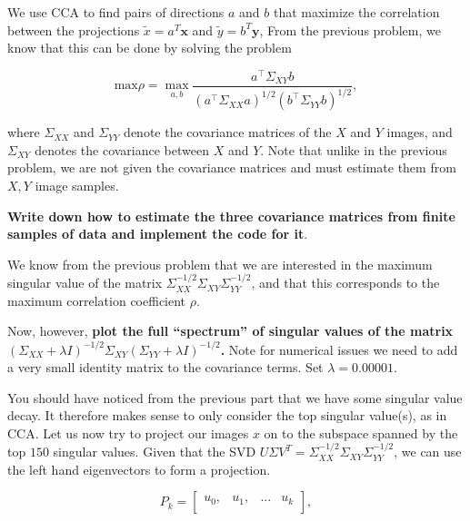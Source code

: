 \begin{Parts}
\Part We use CCA to find pairs of directions $a$ and $b$
that maximize the correlation between the projections $\tilde{x} = a^T\mathbf{x}$ and $\tilde{y} = b^T\mathbf{y}$,  From the previous problem, we know that this can be done by solving the problem 

$$\mbox{max} \rho = \max_{a, b} \frac{a^\top \Sigma_{XY} b}{ \left( a^\top \Sigma_{XX} a\right)^{1/2} \left( b^\top \Sigma_{YY} b\right)^{1/2} },$$ 

where $\Sigma_{XX}$ and $\Sigma_{YY}$ denote the covariance matrices
of the $X$ and $Y$ images, and $\Sigma_{XY}$ denotes the covariance
between $X$ and $Y$. Note that unlike in the previous problem, we are not given the covariance matrices and must estimate them from $X, Y$ image samples.

{\bf Write down how to estimate the three covariance matrices from finite samples of data and implement the code for it}.





\Part We know from the previous problem that we are interested in the
maximum singular value of the matrix $\Sigma_{XX}^{-1/2} \Sigma_{XY}
\Sigma_{YY}^{-1/2}$, and that this corresponds to the maximum correlation coefficient $\rho$. 

Now, however, {\bf plot the full ``spectrum'' of singular values of the matrix $(\Sigma_{XX}+\lambda I)^{-1/2} \Sigma_{XY} (\Sigma_{YY}+\lambda I)^{-1/2}$.} Note for numerical issues we need to add a very small identity matrix to the covariance terms. Set $\lambda = 0.00001$. 





\Part You should have noticed from the previous part that we have some singular value decay. It therefore makes sense to only consider the top singular value(s), as in CCA. Let us now try to project our images $x$ on to the subspace spanned by the top $150$ singular values. Given that the SVD $U\Sigma V^T = \Sigma_{XX}^{-1/2} \Sigma_{XY} \Sigma_{YY}^{-1/2}$, we can use the left hand eigenvectors to form a projection.  %

\[ P_k = \begin{bmatrix}
   u_0 ,   & u_1, & ... & u_{k} \\
\end{bmatrix},   \]


\end{Parts}
